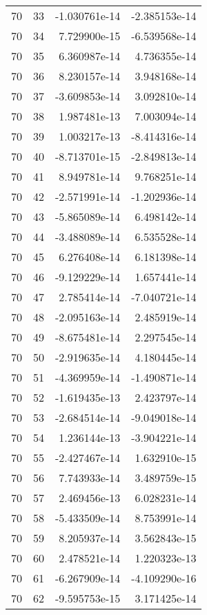 \begin{tabular}{rrrr}
  70 &   33 & -1.030761e-14 & -2.385153e-14 \\
  70 &   34 &  7.729900e-15 & -6.539568e-14 \\
  70 &   35 &  6.360987e-14 &  4.736355e-14 \\
  70 &   36 &  8.230157e-14 &  3.948168e-14 \\
  70 &   37 & -3.609853e-14 &  3.092810e-14 \\
  70 &   38 &  1.987481e-13 &  7.003094e-14 \\
  70 &   39 &  1.003217e-13 & -8.414316e-14 \\
  70 &   40 & -8.713701e-15 & -2.849813e-14 \\
  70 &   41 &  8.949781e-14 &  9.768251e-14 \\
  70 &   42 & -2.571991e-14 & -1.202936e-14 \\
  70 &   43 & -5.865089e-14 &  6.498142e-14 \\
  70 &   44 & -3.488089e-14 &  6.535528e-14 \\
  70 &   45 &  6.276408e-14 &  6.181398e-14 \\
  70 &   46 & -9.129229e-14 &  1.657441e-14 \\
  70 &   47 &  2.785414e-14 & -7.040721e-14 \\
  70 &   48 & -2.095163e-14 &  2.485919e-14 \\
  70 &   49 & -8.675481e-14 &  2.297545e-14 \\
  70 &   50 & -2.919635e-14 &  4.180445e-14 \\
  70 &   51 & -4.369959e-14 & -1.490871e-14 \\
  70 &   52 & -1.619435e-13 &  2.423797e-14 \\
  70 &   53 & -2.684514e-14 & -9.049018e-14 \\
  70 &   54 &  1.236144e-13 & -3.904221e-14 \\
  70 &   55 & -2.427467e-14 &  1.632910e-15 \\
  70 &   56 &  7.743933e-14 &  3.489759e-15 \\
  70 &   57 &  2.469456e-13 &  6.028231e-14 \\
  70 &   58 & -5.433509e-14 &  8.753991e-14 \\
  70 &   59 &  8.205937e-14 &  3.562843e-15 \\
  70 &   60 &  2.478521e-14 &  1.220323e-13 \\
  70 &   61 & -6.267909e-14 & -4.109290e-16 \\
  70 &   62 & -9.595753e-15 &  3.171425e-14 \\

\end{tabular}
